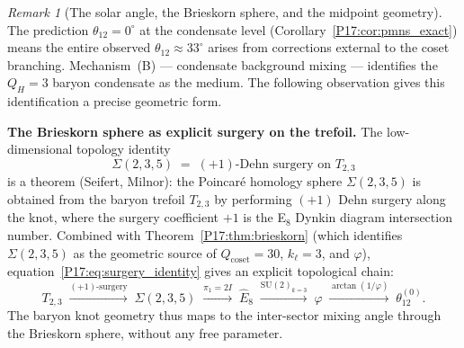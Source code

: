 \documentclass[11pt,a4paper]{article}
\theoremstyle{definition}\newtheorem{definition}[theorem]{Definition}
\theoremstyle{remark}
\newtheorem{remark}[theorem]{Remark}
\newcommand{\vp}{\varphi}
\newcommand{\SU}{\mathrm{SU}}
\newcommand{\twoI}{2I}
\newcommand{\QH}{Q_H}
\begin{document}
\begin{remark}[The solar angle, the Brieskorn sphere, and the midpoint geometry]
\label{P17:rem:solar_angle}
The prediction $\theta_{12}=0^\circ$ at the condensate level
(Corollary~\ref{P17:cor:pmns_exact}) means the entire observed
$\theta_{12}\approx33^\circ$ arises from corrections external to the
coset branching.  Mechanism~(B) --- condensate background mixing ---
identifies the $\QH=3$ baryon condensate as the medium.  The following
observation gives this identification a precise geometric form.

\textbf{The Brieskorn sphere as explicit surgery on the trefoil.}
The low-dimensional topology identity
\begin{equation}
  \Sigma(2,3,5) \;=\; (+1)\text{-Dehn surgery on }T_{2,3}
  \label{P17:eq:surgery_identity}
\end{equation}
is a theorem (Seifert, Milnor): the Poincar\'e homology sphere
$\Sigma(2,3,5)$ is obtained from the baryon trefoil $T_{2,3}$
by performing $(+1)$ Dehn surgery along the knot, where the surgery
coefficient $+1$ is the E$_8$ Dynkin diagram intersection number.
Combined with Theorem~\ref{P17:thm:brieskorn} (which identifies
$\Sigma(2,3,5)$ as the geometric source of $Q_{\mathrm{coset}}=30$,
$k_\ell=3$, and $\vp$), equation~\eqref{P17:eq:surgery_identity} gives an
explicit topological chain:
\[
  T_{2,3}
  \;\xrightarrow{(+1)\text{-surgery}}\;
  \Sigma(2,3,5)
  \;\xrightarrow{\pi_1=\twoI}\;
  \widehat{E}_8
  \;\xrightarrow{\SU(2)_{k=3}}\;
  \vp
  \;\xrightarrow{\arctan(1/\vp)}\;
  \theta_{12}^{(0)}.
\]
The baryon knot geometry thus maps to the inter-sector mixing angle
through the Brieskorn sphere, without any free parameter.


\end{remark}
\end{document}
